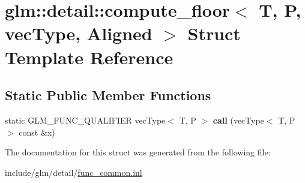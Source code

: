 \hypertarget{structglm_1_1detail_1_1compute__floor}{}\section{glm\+:\+:detail\+:\+:compute\+\_\+floor$<$ T, P, vec\+Type, Aligned $>$ Struct Template Reference}
\label{structglm_1_1detail_1_1compute__floor}
\subsection*{Static Public Member Functions}
\begin{DoxyCompactItemize}
\item 
\mbox{\label{structglm_1_1detail_1_1compute__floor_a69eaf4fee35fffb74bcf8ad3a2beb2d6}} 
static G\+L\+M\+\_\+\+F\+U\+N\+C\+\_\+\+Q\+U\+A\+L\+I\+F\+I\+ER vec\+Type$<$ T, P $>$ {\bfseries call} (vec\+Type$<$ T, P $>$ const \&x)
\end{DoxyCompactItemize}


The documentation for this struct was generated from the following file\+:\begin{DoxyCompactItemize}
\item 
include/glm/detail/\hyperlink{func__common_8inl}{func\+\_\+common.\+inl}\end{DoxyCompactItemize}
